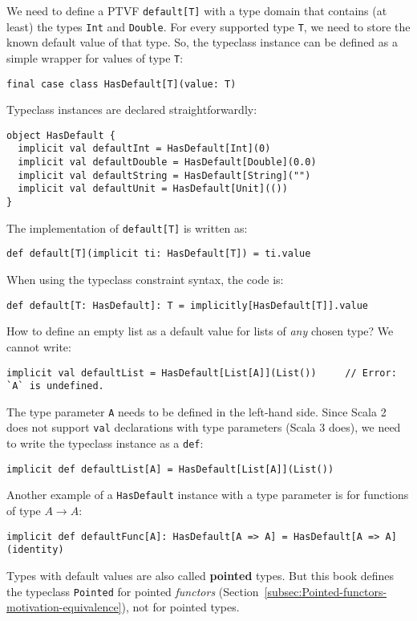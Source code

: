 We need to define a PTVF \lstinline!default[T]! with a type domain
that contains (at least) the types \lstinline!Int! and \lstinline!Double!.
For every supported type \lstinline!T!, we need to store the known
default value of that type. So, the typeclass instance can be defined
as a simple wrapper for values of type \lstinline!T!:
\begin{lstlisting}
final case class HasDefault[T](value: T)
\end{lstlisting}
Typeclass instances are declared straightforwardly:
\begin{lstlisting}
object HasDefault {
  implicit val defaultInt = HasDefault[Int](0)
  implicit val defaultDouble = HasDefault[Double](0.0)
  implicit val defaultString = HasDefault[String]("")
  implicit val defaultUnit = HasDefault[Unit](())
}
\end{lstlisting}
The implementation of \lstinline!default[T]! is written as:
\begin{lstlisting}
def default[T](implicit ti: HasDefault[T]) = ti.value
\end{lstlisting}
When using the typeclass constraint syntax, the code is:
\begin{lstlisting}
def default[T: HasDefault]: T = implicitly[HasDefault[T]].value
\end{lstlisting}

How to define an empty list as a default value for lists of \emph{any}
chosen type? We cannot write:
\begin{lstlisting}
implicit val defaultList = HasDefault[List[A]](List())     // Error: `A` is undefined.
\end{lstlisting}
The type parameter \lstinline!A! needs to be defined in the left-hand
side. Since Scala 2 does not support \lstinline!val! declarations
with type parameters (Scala 3 does), we need to write the typeclass
instance as a \lstinline!def!:
\begin{lstlisting}
implicit def defaultList[A] = HasDefault[List[A]](List())
\end{lstlisting}

Another example of a \lstinline!HasDefault! instance with a type
parameter is for functions of type $A\rightarrow A$:
\begin{lstlisting}
implicit def defaultFunc[A]: HasDefault[A => A] = HasDefault[A => A](identity)
\end{lstlisting}

Types with default values are also called \textbf{pointed}
types. But this book defines the typeclass \lstinline!Pointed! for
pointed \emph{functors} (Section~\ref{subsec:Pointed-functors-motivation-equivalence}),
not for pointed types.

